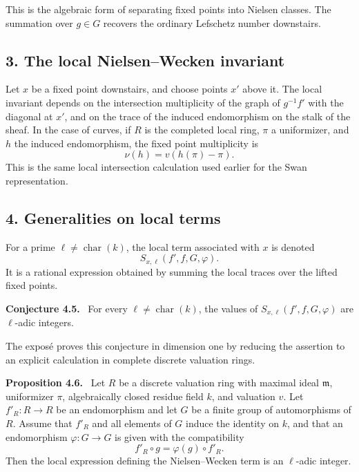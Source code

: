 \documentclass[11pt]{article}
\theoremstyle{plain}
\theoremstyle{definition}
\theoremstyle{remark}
\newenvironment{statement}[1]{\par\medskip\noindent\textbf{#1.}\ }{\par\medskip}
\begin{document}
This is the algebraic form of separating fixed points into Nielsen classes. The summation over $g\in G$ recovers the ordinary Lefschetz number downstairs.

\subsection*{3. The local Nielsen--Wecken invariant}

Let $x$ be a fixed point downstairs, and choose points $x'$ above it. The local invariant depends on the intersection multiplicity of the graph of $g^{-1}f'$ with the diagonal at $x'$, and on the trace of the induced endomorphism on the stalk of the sheaf. In the case of curves, if $R$ is the completed local ring, $\pi$ a uniformizer, and $h$ the induced endomorphism, the fixed point multiplicity is
\[
   \nu(h)=v(h(\pi)-\pi).
\]
This is the same local intersection calculation used earlier for the Swan representation.

\subsection*{4. Generalities on local terms}

For a prime $\ell\ne\operatorname{char}(k)$, the local term associated with $x$ is denoted
\[
   S_{x,\ell}(f',f,G,\varphi).
\]
It is a rational expression obtained by summing the local traces over the lifted fixed points.

\begin{statement}{Conjecture 4.5}
For every $\ell\ne\operatorname{char}(k)$, the values of $S_{x,\ell}(f',f,G,\varphi)$ are $\ell$-adic integers.
\end{statement}

The expos\'e proves this conjecture in dimension one by reducing the assertion to an explicit calculation in complete discrete valuation rings.

\begin{statement}{Proposition 4.6}
Let $R$ be a discrete valuation ring with maximal ideal $\mathfrak m$, uniformizer $\pi$, algebraically closed residue field $k$, and valuation $v$. Let $f'_R:R\to R$ be an endomorphism and let $G$ be a finite group of automorphisms of $R$. Assume that $f'_R$ and all elements of $G$ induce the identity on $k$, and that an endomorphism $\varphi:G\to G$ is given with the compatibility
\[
   f'_R\circ g = \varphi(g)\circ f'_R.
\]
Then the local expression defining the Nielsen--Wecken term is an $\ell$-adic integer.
\end{statement}
\end{document}
